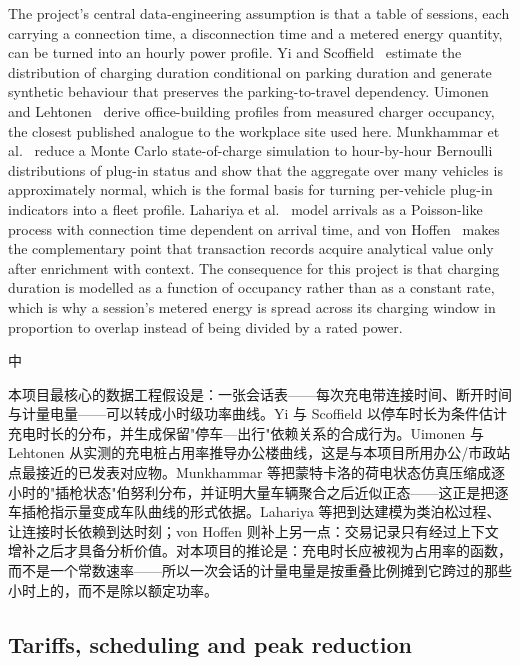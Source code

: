 \documentclass[10pt,a4paper]{article}
\newenvironment{zh}{%
  \par\vspace{1pt}%
  \begingroup
  \color{black!72}\small
  \setlength{\parskip}{0pt}%
  \noindent\textsf{\footnotesize 中}\hspace{3pt}\ignorespaces
}{%
  \par\endgroup\vspace{4pt}%
}
\begin{document}
The project's central data-engineering assumption is that a table of sessions, each carrying a
connection time, a disconnection time and a metered energy quantity, can be turned into an hourly
power profile. Yi and Scoffield~\cite{Yi2018ResidentialLoadProfileGeneration} estimate the
distribution of charging duration conditional on parking duration and generate synthetic behaviour
that preserves the parking-to-travel dependency. Uimonen and
Lehtonen~\cite{Uimonen2020OfficeBuildingOccupancy} derive office-building profiles from measured
charger occupancy, the closest published analogue to the workplace site used here.
Munkhammar et al.~\cite{Munkhammar2014BernoulliPEVCharging} reduce a Monte Carlo state-of-charge
simulation to hour-by-hour Bernoulli distributions of plug-in status and show that the aggregate
over many vehicles is approximately normal, which is the formal basis for turning per-vehicle
plug-in indicators into a fleet profile. Lahariya et
al.~\cite{Lahariya2020SyntheticDataGenerator} model arrivals as a Poisson-like process with
connection time dependent on arrival time, and von
Hoffen~\cite{vonHoffen2016ChargingTransactionAnalytics} makes the complementary point that
transaction records acquire analytical value only after enrichment with context. The consequence
for this project is that charging duration is modelled as a function of occupancy rather than as a
constant rate, which is why a session's metered energy is spread across its charging window in
proportion to overlap instead of being divided by a rated power.

\begin{zh}
本项目最核心的数据工程假设是：一张会话表——每次充电带连接时间、断开时间与计量电量——可以转成小时级功率曲线。Yi 与 Scoffield 以停车时长为条件估计充电时长的分布，并生成保留"停车—出行"依赖关系的合成行为。Uimonen 与 Lehtonen 从实测的充电桩占用率推导办公楼曲线，这是与本项目所用办公/市政站点最接近的已发表对应物。Munkhammar 等把蒙特卡洛的荷电状态仿真压缩成逐小时的"插枪状态"伯努利分布，并证明大量车辆聚合之后近似正态——这正是把逐车插枪指示量变成车队曲线的形式依据。Lahariya 等把到达建模为类泊松过程、让连接时长依赖到达时刻；von Hoffen 则补上另一点：交易记录只有经过上下文增补之后才具备分析价值。对本项目的推论是：充电时长应被视为占用率的函数，而不是一个常数速率——所以一次会话的计量电量是按重叠比例摊到它跨过的那些小时上的，而不是除以额定功率。
\end{zh}

\subsection{Tariffs, scheduling and peak reduction}
\end{document}
